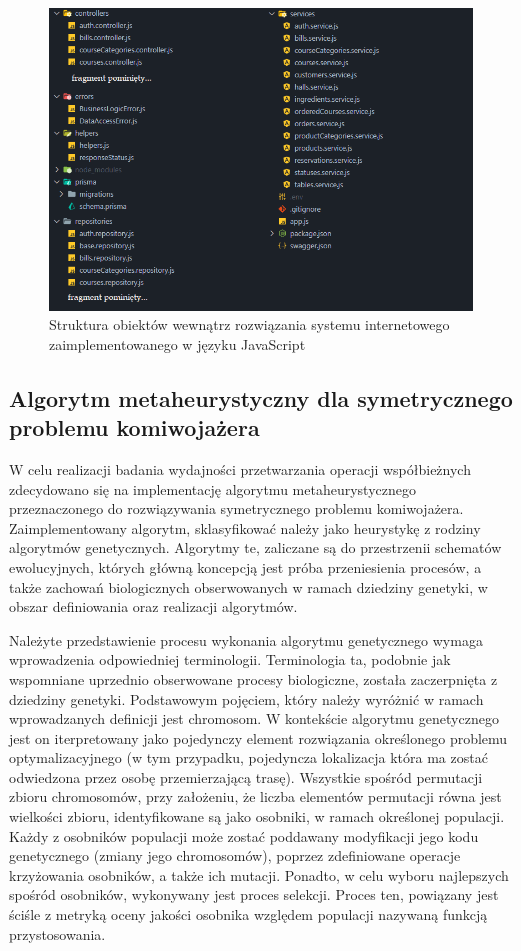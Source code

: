 \begin{figure}[ht]
    \centering
     \includegraphics[width=\linewidth]{rys04/struktura-plikow-nodejs.png}
    \caption{Struktura obiektów wewnątrz rozwiązania systemu internetowego zaimplementowanego w języku JavaScript}
    \label{fig:struktura-plikow-nodejs}
\end{figure}

\subsection*{Algorytm metaheurystyczny dla symetrycznego problemu komiwojażera}
W celu realizacji badania wydajności przetwarzania operacji współbieżnych zdecydowano się na implementację algorytmu metaheurystycznego przeznaczonego do rozwiązywania symetrycznego problemu komiwojażera. Zaimplementowany algorytm, sklasyfikować należy jako heurystykę z rodziny algorytmów genetycznych. Algorytmy te, zaliczane są do przestrzenii schematów ewolucyjnych, których główną koncepcją jest próba przeniesienia procesów, a także zachowań biologicznych obserwowanych w ramach dziedziny genetyki, w obszar definiowania oraz realizacji algorytmów. 

Należyte przedstawienie procesu wykonania algorytmu genetycznego wymaga wprowadzenia odpowiedniej terminologii. Terminologia ta, podobnie jak wspomniane uprzednio obserwowane procesy biologiczne, została zaczerpnięta z dziedziny genetyki. Podstawowym pojęciem, który należy wyróżnić w ramach wprowadzanych definicji jest chromosom. W kontekście algorytmu genetycznego jest on iterpretowany jako pojedynczy element rozwiązania określonego problemu optymalizacyjnego (w tym przypadku, pojedyncza lokalizacja która ma zostać odwiedzona przez osobę przemierzającą trasę). Wszystkie spośród permutacji zbioru chromosomów, przy założeniu, że liczba elementów permutacji równa jest wielkości zbioru, identyfikowane są jako osobniki, w ramach określonej populacji. Każdy z osobników populacji może zostać poddawany modyfikacji jego kodu genetycznego (zmiany jego chromosomów), poprzez zdefiniowane operacje krzyżowania osobników, a także ich mutacji. Ponadto, w celu wyboru najlepszych spośród osobników, wykonywany jest proces selekcji. Proces ten, powiązany jest ściśle z metryką oceny jakości osobnika względem populacji nazywaną funkcją przystosowania.

